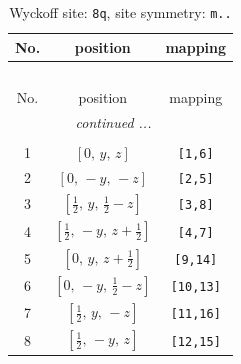 \documentclass[fleqn,8pt]{jsarticle}
\begin{document}
\begin{longtable}{ccc}
\caption{Wyckoff site: {\tt 8q}, site symmetry: {\tt m..}}
 \\
 \hline \hline
No. & position & mapping \\ \hline \endfirsthead

\multicolumn{2}{l}{\tablename\ \thetable{}} \\
 \hline \hline
No. & position & mapping \\ \hline \endhead

 \hline \hline
\multicolumn{2}{r}{\footnotesize\it continued ...} \\ \endfoot

 \hline \hline
\multicolumn{2}{r}{} \\ \endlastfoot

1 & $\left[ 0,\, y,\, z \right]$ & {\tt [1,6]} \\ \hline
2 & $\left[ 0,\, - y,\, - z \right]$ & {\tt [2,5]} \\ \hline
3 & $\left[ \frac{1}{2},\, y,\, \frac{1}{2} - z \right]$ & {\tt [3,8]} \\ \hline
4 & $\left[ \frac{1}{2},\, - y,\, z + \frac{1}{2} \right]$ & {\tt [4,7]} \\ \hline
5 & $\left[ 0,\, y,\, z + \frac{1}{2} \right]$ & {\tt [9,14]} \\ \hline
6 & $\left[ 0,\, - y,\, \frac{1}{2} - z \right]$ & {\tt [10,13]} \\ \hline
7 & $\left[ \frac{1}{2},\, y,\, - z \right]$ & {\tt [11,16]} \\ \hline
8 & $\left[ \frac{1}{2},\, - y,\, z \right]$ & {\tt [12,15]} \\
\end{longtable}
\renewcommand{\arraystretch}{1.2}
\end{document}
